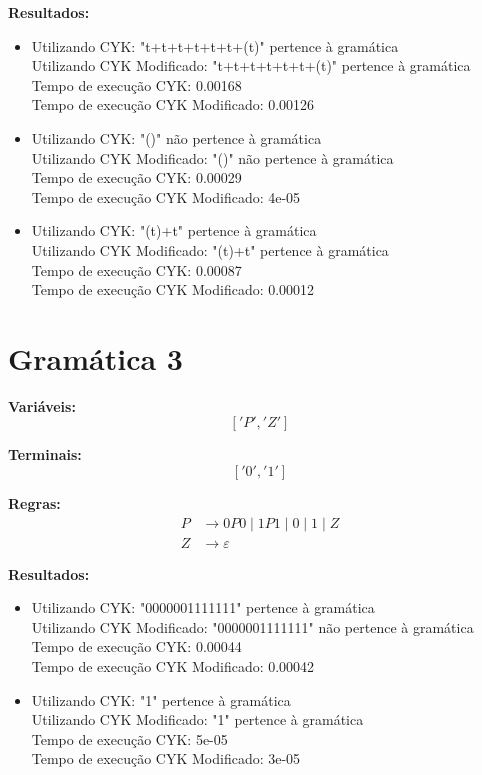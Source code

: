 \documentclass[a4paper,12pt]{article} %
\begin{document}
\textbf{Resultados:}
\begin{itemize}
    \item Utilizando CYK: "t+t+t+t+t+t+(t)" pertence à gramática \\
    Utilizando CYK Modificado: "t+t+t+t+t+t+(t)" pertence à gramática \\
    Tempo de execução CYK: 0.00168 \\
    Tempo de execução CYK Modificado: 0.00126 \\
    
    \item Utilizando CYK: "()" não pertence à gramática \\
    Utilizando CYK Modificado: "()" não pertence à gramática \\
    Tempo de execução CYK: 0.00029 \\
    Tempo de execução CYK Modificado: 4e-05 \\
    
    \item Utilizando CYK: "(t)+t" pertence à gramática \\
    Utilizando CYK Modificado: "(t)+t" pertence à gramática \\
    Tempo de execução CYK: 0.00087 \\
    Tempo de execução CYK Modificado: 0.00012 \\
\end{itemize}

\section*{Gramática 3}
\textbf{Variáveis:}
\[
['P', 'Z']
\]

\textbf{Terminais:}
\[
['0', '1']
\]

\textbf{Regras:}
\begin{align*}
P &\to 0 P 0 \mid 1 P 1 \mid 0 \mid 1 \mid Z \\
Z &\to \varepsilon
\end{align*}

\textbf{Resultados:}
\begin{itemize}
    \item Utilizando CYK: "0000001111111" pertence à gramática \\
    Utilizando CYK Modificado: "0000001111111" não pertence à gramática \\
    Tempo de execução CYK: 0.00044 \\
    Tempo de execução CYK Modificado: 0.00042 \\
    
    \item Utilizando CYK: "1" pertence à gramática \\
    Utilizando CYK Modificado: "1" pertence à gramática \\
    Tempo de execução CYK: 5e-05 \\
    Tempo de execução CYK Modificado: 3e-05 \\
\end{itemize}
\end{document}
